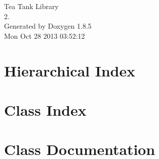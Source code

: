 \documentclass[twoside]{book}
\newcommand{\clearemptydoublepage}{%
  \newpage{\pagestyle{empty}\cleardoublepage}%
}
\begin{document}
\hypersetup{pageanchor=false}
\begin{titlepage}
\vspace*{7cm}
\begin{center}%
{\Large Tea Tank Library \\[1ex]\large 2. }\\
\vspace*{1cm}
{\large Generated by Doxygen 1.8.5}\\
\vspace*{0.5cm}
{\small Mon Oct 28 2013 03:52:12}\\
\end{center}
\end{titlepage}
\clearemptydoublepage
\tableofcontents
\clearemptydoublepage
{}
\hypersetup{pageanchor=true}

\chapter{Hierarchical Index}

\chapter{Class Index}

\chapter{Class Documentation}




























\newpage
{}
{}
\printindex
\end{document}
